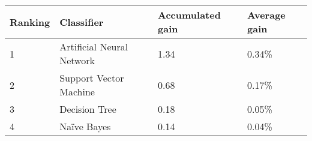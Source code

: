 \begin{tabular}{|l|l|l|l|}
\hline
Ranking  & Classifier                & Accumulated gain  & Average gain\\
\hline
1        & Artificial Neural Network & 1.34   & 0.34\%        \\
2        & Support Vector Machine    & 0.68  & 0.17\%       \\
3        & Decision Tree             & 0.18   & 0.05\%         \\
4        & Naïve Bayes               & 0.14   & 0.04\%         \\
\hline
\end{tabular}

